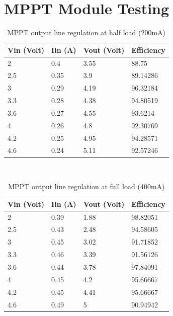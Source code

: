 \section{MPPT Module Testing}

\begin{table}[H]
\centering
\begin{tabular}{|l|l|l|l|}
\hline
Vin (Volt) & Iin (A) & Vout (Volt) & Efficiency \\ \hline
2          & 0.4     & 3.55        & 88.75      \\ \hline
2.5        & 0.35    & 3.9         & 89.14286   \\ \hline
3          & 0.29    & 4.19        & 96.32184   \\ \hline
3.3        & 0.28    & 4.38        & 94.80519   \\ \hline
3.6        & 0.27    & 4.55        & 93.6214    \\ \hline
4          & 0.26    & 4.8         & 92.30769   \\ \hline
4.2        & 0.25    & 4.95        & 94.28571   \\ \hline
4.6        & 0.24    & 5.11        & 92.57246   \\ \hline
\end{tabular}
\caption{MPPT output line regulation at half load (200mA)}
\label{table:4}
\end{table}	
\\
\begin{table}[H]
\centering
\begin{tabular}{|l|l|l|l|}
\hline
Vin (Volt) & Iin (A) & Vout (Volt) & Efficiency \\ \hline
2          & 0.39    & 1.88        & 98.82051   \\ \hline
2.5        & 0.43    & 2.48        & 94.58605   \\ \hline
3          & 0.45    & 3.02        & 91.71852   \\ \hline
3.3        & 0.46    & 3.39        & 91.56126   \\ \hline
3.6        & 0.44    & 3.78        & 97.84091   \\ \hline
4          & 0.45    & 4.2         & 95.66667   \\ \hline
4.2        & 0.45    & 4.41        & 95.66667   \\ \hline
4.6        & 0.49    & 5           & 90.94942   \\ \hline
\end{tabular}
\caption{MPPT output line regulation at full load (400mA)}
\label{table:4}
\end{table}
